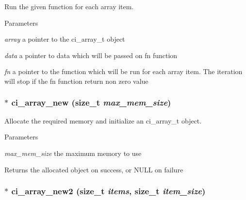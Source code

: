 Run the given function for each array item. 
\begin{DoxyParams}{Parameters}
\item[{\em array}]a pointer to the ci\_\-array\_\-t object \item[{\em data}]a pointer to data which will be passed on fn function \item[{\em fn}]a pointer to the function which will be run for each array item. The iteration will stop if the fn function return non zero value \end{DoxyParams}
\hypertarget{group__SIMPLE__ARRAYS_ga2ea1f00c1df7ca10c9a612891d085bef}{
\subsubsection[{ci\_\-array\_\-new}]{$\ast$ ci\_\-array\_\-new (size\_\-t {\em max\_\-mem\_\-size})}}
\label{group__SIMPLE__ARRAYS_ga2ea1f00c1df7ca10c9a612891d085bef}


Allocate the required memory and initialize an ci\_\-array\_\-t object. 
\begin{DoxyParams}{Parameters}
\item[{\em max\_\-mem\_\-size}]the maximum memory to use \end{DoxyParams}
\begin{DoxyReturn}{Returns}
the allocated object on success, or NULL on failure 
\end{DoxyReturn}
\hypertarget{group__SIMPLE__ARRAYS_gaeec8ec3aaee4be84d57b1f0e19abcfba}{
\subsubsection[{ci\_\-array\_\-new2}]{$\ast$ ci\_\-array\_\-new2 (size\_\-t {\em items}, \/  size\_\-t {\em item\_\-size})}}
\label{group__SIMPLE__ARRAYS_gaeec8ec3aaee4be84d57b1f0e19abcfba}


